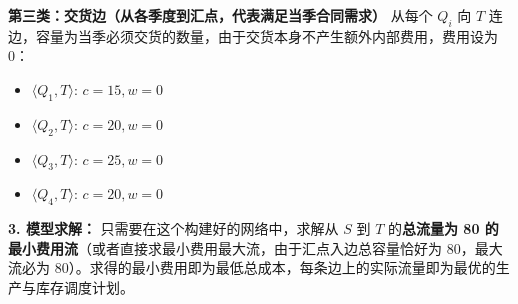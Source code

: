 \documentclass{ctexart}
\begin{document}
\begin{enumerate}[label=\arabic*.]
        \textbf{第三类：交货边（从各季度到汇点，代表满足当季合同需求）}
        从每个 $Q_i$ 向 $T$ 连边，容量为当季必须交货的数量，由于交货本身不产生额外内部费用，费用设为 0：
        \begin{itemize}
            \item $\langle Q_1, T \rangle$: $c = 15, w = 0$
            \item $\langle Q_2, T \rangle$: $c = 20, w = 0$
            \item $\langle Q_3, T \rangle$: $c = 25, w = 0$
            \item $\langle Q_4, T \rangle$: $c = 20, w = 0$
        \end{itemize}

        \textbf{3. 模型求解：}
        只需要在这个构建好的网络中，求解从 $S$ 到 $T$ 的\textbf{总流量为 80 的最小费用流}（或者直接求最小费用最大流，由于汇点入边总容量恰好为 80，最大流必为 80）。求得的最小费用即为最低总成本，每条边上的实际流量即为最优的生产与库存调度计划。
\end{enumerate}
\end{document}
